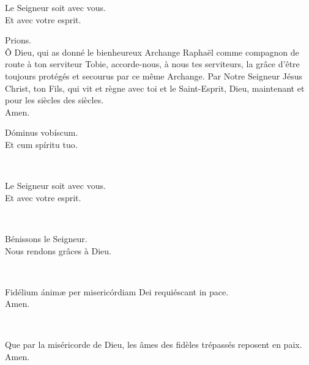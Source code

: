 \documentclass[twoside]{article}
\begin{document}
\begin{paracol}[1]{2}
\switchcolumn

\vv Le Seigneur soit avec vous. \\
\rr Et avec votre esprit.

Prions. \\
Ô Dieu, qui as donné le bienheureux Archange Raphaël comme compagnon de route à ton serviteur Tobie, accorde-nous, à nous tes serviteurs, la grâce d’être toujours protégés et secourus par ce même Archange.
Par Notre Seigneur Jésus Christ, ton Fils, qui vit et règne avec toi et le Saint-Esprit, Dieu, maintenant et pour les siècles des siècles.\\
\rr Amen.

\switchcolumn*

\vv Dóminus vobíscum. \\
\rr Et cum spíritu tuo.

~~


\switchcolumn

\vv Le Seigneur soit avec vous. \\
\rr Et avec votre esprit.

~~

\vv Bénissons le Seigneur. \\
\rr Nous rendons grâces à Dieu.

\switchcolumn*

~~

\vv Fidélium ánimæ per misericórdiam Dei requiéscant in pace. \\
\rr Amen.

\switchcolumn

~~

\vv Que par la miséricorde de Dieu, les âmes des fidèles trépassés reposent en paix. \\
\rr Amen.

\end{paracol}
\end{document}
